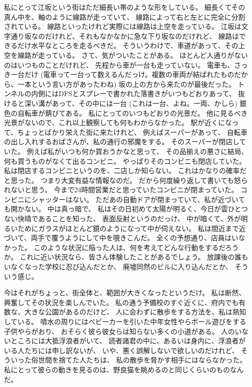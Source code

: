 \documentclass[]{article}
\begin{document}
私にとって江坂という街はただ細長い帯のような形をしている。
細長くてその真ん中を、軸のように線路が走っていて、
線路によって右と左とに完全に分割されている。
線路といったけれど実際には線路は上空を走っている。
江坂は文字通り坂なのだけれど、それもなかなかに急な下り坂なのだけれど、
線路はできるだけ水平なところを走るべきだ。
そういうわけで、車道があって、その上空を線路が走っている。
さて、気がついたことがある。
ほとんど人通りがないのはいつものことだけれど、
先程から車が一台も走っていない。 電車も、さっき一台だけ
(電車って一台って数えるんだっけ。複数の車両が結ばれたものだから、一本という言い方があったわね)
坂の上の方から来たのが最後だった。
トンネルの内側にはDFSとスプレーで書かれた落書きがいつもどおりあって、
抜けると深い溝があって、その中には一台 (これは一台、よね。一両、かしら)
銀色の自転車が錆びてある。 私にとってのいつもどおりの光景だ。
他に見るべき光景がないので、これ以上観察しても何もわからなかった。
駅が近くになって、ちょっとばかり栄えた街に来たけれど、
例えばスーパーがあって、
自転車の出し入れするおばさんが、私の通行の邪魔をする。
そのスーパーが閉店していた。 例えば私がいつも何か買おうかなと思って、
その品揃えの悪さに結局、何も買うものがなくて出るコンビニ。
やっぱりそのコンビニも閉店していた。
私は閉店するコンビニというのを、二店しか知らない。
これはかなりの確率だと思った。 つまり大変有益な情報なのだ。
だから何度繰り返して書いても怒られないと思う。
今まで24時間営業だと思っていたコンビニが閉まっていた。
コンビニにシャッターはない。
ただあの自動ドアが閉まっていて、私が近づいても開かない。 中は真っ暗で、
私はその日初めて太陽が明るく、今日が雲ひとつない快晴であることを知った、
表面反射というのだっけ、
中が暗くて、外が明るいためにガラスがほとんど鏡のようになって中が伺えない。
私は間近まで近づいて、両手で覆うようにして中を覗きこんだ。
全くの予想通り、店員はいなかった。
このような状況に陥った人は、何を考えてどんな行動をするだろうか。
これに近い状況なら、皆さん体験したことがあるでしょう。
放課後の誰もいなくなった学校に忍び込んだとか、
廃墟同然のビルに入り込んだとか、 そういう感じ。

今はそれがちょっと、街全体と、範囲が大きくなったというだけ。
私は断然、興奮してその状況を楽しんでいた。
私の通う予備校のすぐ近くに、府内でも有数な、大きな公園があるのだけど、
人に会わずに散歩をする方法を、私は熟知している。
噴水の周りにはベビーカーを引いた中年女性やらボール遊びをする子供やらがおり、
おそらく彼ら彼女らは知らない多くの小道がある。
人のいないところには大抵浮浪者がいて、
読者諸君の中に、あるいは身内に、浮浪者がいる人たちには申し訳ないが、
いや、悪く誤解しないで欲しいのだけれど、
そういった俗世間を捨てた人たちは、
私の散歩を脅かす相手にはならなかった。
私にとって彼らの動きを見るのは、野良猫を眺めるのと同じくらいのものなんだ。
\end{document}
